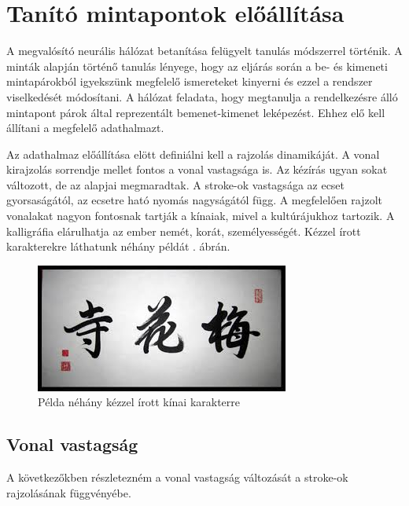 \section{Tanító mintapontok előállítása}

A megvalósító neurális hálózat betanítása felügyelt tanulás módszerrel történik. A minták alapján történő tanulás lényege, hogy az eljárás során a be- és kimeneti mintapárokból igyekszünk megfelelő ismereteket kinyerni és ezzel a rendszer viselkedését módosítani. A hálózat feladata, hogy megtanulja a rendelkezésre álló mintapont párok által reprezentált bemenet-kimenet leképezést. Ehhez elő kell állítani a megfelelő adathalmazt.

Az adathalmaz előállítása elött definiálni kell a rajzolás dinamikáját. A vonal kirajzolás sorrendje mellet fontos a vonal vastagsága is. Az kézírás ugyan sokat változott, de az alapjai megmaradtak. A stroke-ok vastagsága az ecset gyorsaságától, az ecsetre ható nyomás nagyságától függ. A megfelelően rajzolt vonalakat nagyon fontosnak tartják a kínaiak, mivel a kultúrájukhoz tartozik. A kalligráfia elárulhatja az ember nemét, korát, személyességét. Kézzel írott karakterekre láthatunk néhány példát . ábrán.

\begin{figure}[h]
\centering
\includegraphics[scale=0.8]{images/calligraphy}
\caption{Példa néhány kézzel írott kínai karakterre}
\label{fig:calligraphy}
\end{figure}

\subsection{Vonal vastagság}

A következőkben részletezném a vonal vastagság változását a stroke\cite{StrokeCJ9}-ok rajzolásának függvényébe. 

